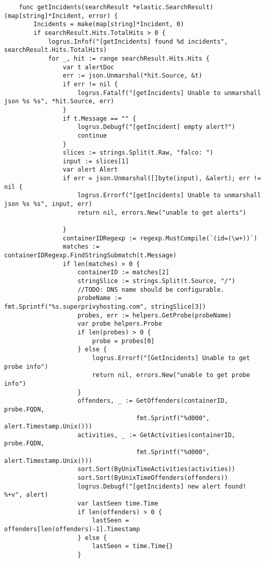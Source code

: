 \begin{verbatim}
    func getIncidents(searchResult *elastic.SearchResult) (map[string]*Incident, error) {
        Incidents = make(map[string]*Incident, 0)
        if searchResult.Hits.TotalHits > 0 {
            logrus.Infof("[getIncidents] found %d incidents", searchResult.Hits.TotalHits)
            for _, hit := range searchResult.Hits.Hits {
                var t alertDoc
                err := json.Unmarshal(*hit.Source, &t)
                if err != nil {
                    logrus.Fatalf("[getIncidents] Unable to unmarshall json %s %s", *hit.Source, err)
                }
                if t.Message == "" {
                    logrus.Debugf("[getIncident] empty alert?")
                    continue
                }
                slices := strings.Split(t.Raw, "falco: ")
                input := slices[1]
                var alert Alert
                if err = json.Unmarshal([]byte(input), &alert); err != nil {
                    logrus.Errorf("[getIncidents] Unable to unmarshall json %s %s", input, err)
                    return nil, errors.New("unable to get alerts")
    
                }
                containerIDRegexp := regexp.MustCompile(`(id=(\w+))`)
                matches := containerIDRegexp.FindStringSubmatch(t.Message)
                if len(matches) > 0 {
                    containerID := matches[2]
                    stringSlice := strings.Split(t.Source, "/")
                    //TODO: DNS name should be configurable.
                    probeName := fmt.Sprintf("%s.superprivyhosting.com", stringSlice[3])
                    probes, err := helpers.GetProbe(probeName)
                    var probe helpers.Probe
                    if len(probes) > 0 {
                        probe = probes[0]
                    } else {
                        logrus.Errorf("[GetIncidents] Unable to get probe info")
                        return nil, errors.New("unable to get probe info")
                    }
                    offenders, _ := GetOffenders(containerID, probe.FQDN, 
                                    fmt.Sprintf("%d000", alert.Timestamp.Unix()))
                    activities, _ := GetActivities(containerID, probe.FQDN,
                                    fmt.Sprintf("%d000", alert.Timestamp.Unix()))
                    sort.Sort(ByUnixTimeActivities(activities))
                    sort.Sort(ByUnixTimeOffenders(offenders))
                    logrus.Debugf("[getIncidents] new alert found! %+v", alert)
                    var lastSeen time.Time
                    if len(offenders) > 0 {
                        lastSeen = offenders[len(offenders)-1].Timestamp
                    } else {
                        lastSeen = time.Time{}
                    }
    

\end{verbatim}
